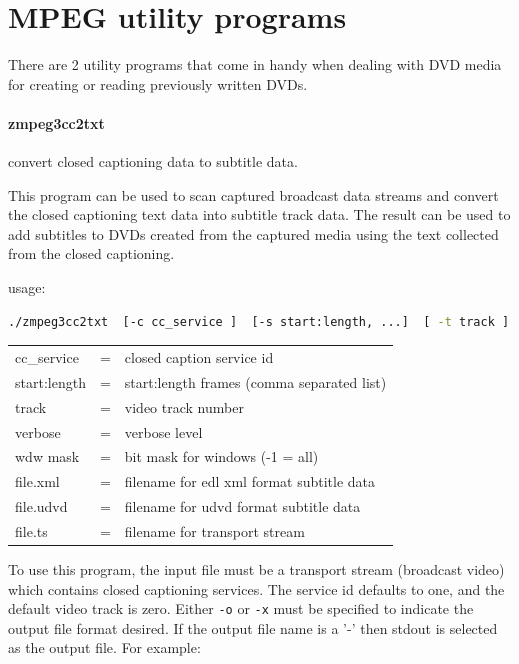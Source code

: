 \section{MPEG utility programs}%
\label{sec:mpeg_utility_programs}

There are 2 utility programs that come in handy when dealing with DVD media for creating or reading previously written DVDs.

\paragraph{zmpeg3cc2txt} convert closed captioning data to subtitle data.

This program can be used to scan captured broadcast data streams and convert the closed captioning text data into subtitle track data.  The result can be used to add subtitles to DVDs created from the captured media using the text collected from the closed captioning.

usage:

\begin{lstlisting}[language=bash,numbers=none]
./zmpeg3cc2txt  [-c cc_service ]  [-s start:length, ...]  [ -t track ]  [-v verbose ] [-w wdw mask ]  [-x file.xml ]  [-o file.udvd ]  file.ts
\end{lstlisting}

\begin{tabular}{lcl}
    cc\_service&=&closed caption service id\\
    
    start:length&=&start:length frames (comma separated list)\\
    
    track&=&video track number\\
    
    verbose&=&verbose level\\
    
    wdw mask&=&bit mask for windows (-1 = all)\\
    
    file.xml&=&filename for edl xml format subtitle data\\
    
    file.udvd&=&filename for udvd format subtitle data\\
    
    file.ts&=&filename for transport stream\\    
\end{tabular}

To use this program, the input file must be a transport stream (broadcast video) which contains closed captioning services.  The service id defaults to one, and the default video track is zero.  Either \texttt{-o} or \texttt{-x} must be specified to indicate the output file format desired.  If the output file name is a '-' then stdout is selected as the output file. 
For example:

